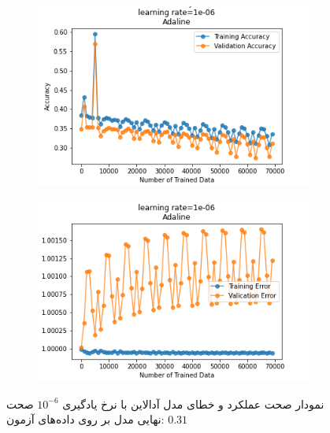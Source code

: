 \documentclass[12pt, a4paper]{article}
\begin{document}
\begin{figure}[h]
    \begin{subfigure}{0.45\linewidth}
        \centering
        \includegraphics[width=\linewidth]{images/5/adaline/lr/acc_1e-06.png}
    \end{subfigure}
    \hfil
    \begin{subfigure}{0.45\linewidth}
        \centering
        \includegraphics[width=\linewidth]{images/5/adaline/lr/error_1e-06.png}
    \end{subfigure}
    \caption{نمودار صحت عملکرد‌ و خطای مدل آدالاین با نرخ یادگیری $10^{-6}$
    \newline
    صحت نهایی مدل بر روی داده‌های آزمون: $0.31$}
\end{figure}
\end{document}
